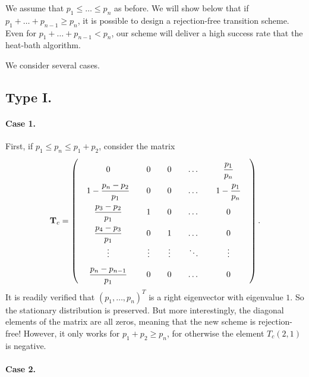 \documentclass[12pt]{article}
\begin{document}
We assume that $p_1 \le \dots \le p_n$ as before.
We will show below that if $p_1 + \dots + p_{n-1} \ge p_n$,
it is possible to design a rejection-free transition scheme.
Even for $p_1 + \dots + p_{n-1} < p_n$,
our scheme will deliver a high success rate
that the heat-bath algorithm.

We consider several cases.

\subsection{Type I.}

\paragraph{Case 1.}

First, if $p_1 \le p_n \le p_1+ p_2$,
consider the matrix
$$
  \mathbf T_{c}
=
\left(
  \arraycolsep=10.0pt\def\arraystretch{2.0}
  \begin{array}{cccccc}
    0     &   0   &   0   &   \dots  &   \dfrac{p_1}{p_n}       \\
    1-\dfrac{p_n - p_2}{p_1}   &   0   &   0   &   \dots  &   1 - \dfrac{p_1}{p_n} \\
    \dfrac{p_3 - p_2}{p_1}     &   1   &   0   &   \dots  &   0 \\
    \dfrac{p_4 - p_3}{p_1}     &   0   &   1   &   \dots  &   0 \\
    \vdots&\vdots &\vdots &   \ddots &   \vdots \\
    \dfrac{p_n - p_{n-1}}{p_1} &   0   &   0   &   \dots  &   0 \\
  \end{array}
\right).
$$
It is readily verified that $(p_1, \dots, p_n)^T$
is a right eigenvector with eigenvalue $1$.
%
So the stationary distribution is preserved.
%
But more interestingly,
the diagonal elements of the matrix are all zeros,
meaning that the new scheme is rejection-free!
%
However, it only works for $p_1 + p_2 \ge p_n$,
for otherwise the element $T_c(2,1)$ is negative.

\paragraph{Case 2.}
\end{document}
